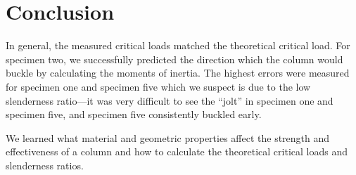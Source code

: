 \documentclass[12 pt]{article}
\begin{document}
\section{Conclusion} \label{conclusion}
In general, the measured critical loads matched the theoretical critical load. For specimen two, we successfully predicted the direction which the column would buckle by calculating the moments of inertia. The highest errors were measured for specimen one and specimen five which we suspect is due to the low slenderness ratio---it was very difficult to see the ``jolt'' in specimen one and specimen five, and specimen five consistently buckled early.

We learned what material and geometric properties affect the strength and effectiveness of a column and how to calculate the theoretical critical loads and slenderness ratios.
\end{document}
